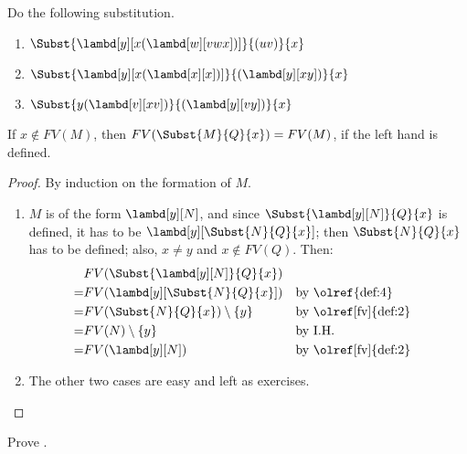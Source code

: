 \documentclass[../../../include/open-logic-section]{subfiles}
\begin{document}
\begin{prob}
  Do the following substitution.
  \begin{enumerate}
  \item $\Subst{\lambd[y][x(\lambd[w][vwx])]}{(uv)}{x}$
  \item $\Subst{\lambd[y][x(\lambd[x][x])]}{(\lambd[y][xy])}{x}$
  \item $\Subst{y(\lambd[v][xv])}{(\lambd[y][vy])}{x}$
  \end{enumerate}
\end{prob}

\begin{thm} 
  If $x \notin FV(M)$, then $FV(\Subst{M}{Q}{x}) = FV(M)$, if
  the left hand is defined.
\end{thm}
\begin{proof}
  By induction on the formation of $M$.
  \begin{enumerate}
    \item $M$ is of the form $\lambd[y][N]$, and
      since $\Subst{\lambd[y][N]}{Q}{x}$ is defined, it has to be
      $\lambd[y][\Subst{N}{Q}{x}]$; then $\Subst{N}{Q}{x}$ has
      to be defined; also, $x \neq y$ and $x \notin FV(Q)$. Then:
      \begin{align*}
        &FV(\Subst{\lambd[y][N]}{Q}{x}) \\
        =&FV(\lambd[y][\Subst{N}{Q}{x}]) && \text{by \olref{def:4}}\\
        =&FV(\Subst{N}{Q}{x}) \setminus \{y\} && \text{by
                                                     \olref[fv]{def:2}}
        \\
        =&FV(N) \setminus \{y\} && \text{by I.H.} \\
        =&FV(\lambd[y][N]) && \text{by \olref[fv]{def:2}}
      \end{align*}
    \item The other two cases are easy and left as exercises. 
  \end{enumerate}
\end{proof}

\begin{prob}
  Prove .
\end{prob}
\end{document}
